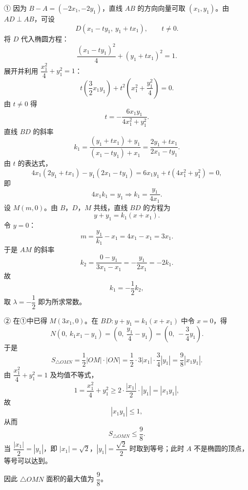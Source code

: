 \begin{answer}
① 因为 $B-A=(-2x_1,-2y_1)$，直线 $AB$ 的方向向量可取 $(x_1,y_1)$。由 $AD\perp AB$，可设
\nopagebreak[4]
\[D(x_1-ty_1,\ y_1+tx_1),\qquad t\neq0 .\]
将 $D$ 代入椭圆方程：
\nopagebreak[4]
\[\frac{(x_1-ty_1)^2}4+(y_1+tx_1)^2=1 .\]
展开并利用 $\dfrac{x_1^2}4+y_1^2=1$：
\nopagebreak[4]
\[t\left(\frac32x_1y_1\right)+t^2\left(x_1^2+\frac{y_1^2}4\right)=0 .\]
由 $t\neq0$ 得
\nopagebreak[4]
\[t=-\frac{6x_1y_1}{4x_1^2+y_1^2}.\]
直线 $BD$ 的斜率
\nopagebreak[4]
\[k_1=\frac{(y_1+tx_1)+y_1}{(x_1-ty_1)+x_1}
=\frac{2y_1+tx_1}{2x_1-ty_1}.\]
由 $t$ 的表达式，
\nopagebreak[4]
\[4x_1(2y_1+tx_1)-y_1(2x_1-ty_1)
=6x_1y_1+t(4x_1^2+y_1^2)=0,\]
即
\nopagebreak[4]
\[4x_1k_1=y_1\Longrightarrow k_1=\frac{y_1}{4x_1}.\]
设 $M(m,0)$。由 $B$，$D$，$M$ 共线，直线 $BD$ 的方程为
\nopagebreak[4]
\[y+y_1=k_1(x+x_1).\]
令 $y=0$：
\nopagebreak[4]
\[m=\frac{y_1}{k_1}-x_1=4x_1-x_1=3x_1 .\]
于是 $AM$ 的斜率
\nopagebreak[4]
\[k_2=\frac{0-y_1}{3x_1-x_1}=-\frac{y_1}{2x_1}=-2k_1 .\]
故
\nopagebreak[4]
\[k_1=-\frac12k_2,\]
取 $\lambda=-\dfrac12$ 即为所求常数。

② 在①中已得 $M(3x_1,0)$。在 $BD:y+y_1=k_1(x+x_1)$ 中令 $x=0$，得
\nopagebreak[4]
\[N\left(0,\ k_1x_1-y_1\right)
=\left(0,\ \frac{y_1}4-y_1\right)
=\left(0,\ -\frac34y_1\right).\]
于是
\nopagebreak[4]
\[S_{\triangle OMN}=\frac12|OM|\cdot|ON|
=\frac12\cdot3|x_1|\cdot\frac34|y_1|
=\frac98|x_1y_1| .\]
由 $\dfrac{x_1^2}4+y_1^2=1$ 及均值不等式，
\nopagebreak[4]
\[1=\frac{x_1^2}4+y_1^2\geqslant2\cdot\frac{|x_1|}2\cdot|y_1|=|x_1y_1|,\]
故
\nopagebreak[4]
\[|x_1y_1|\leqslant1,\]
从而
\nopagebreak[4]
\[S_{\triangle OMN}\leqslant\frac98 .\]
当 $\dfrac{|x_1|}2=|y_1|$，即 $|x_1|=\sqrt2$，$|y_1|=\dfrac{\sqrt2}2$ 时取到等号；此时 $A$ 不是椭圆的顶点，等号可以达到。

因此 $\triangle OMN$ 面积的最大值为 $\dfrac98$。



\end{answer}